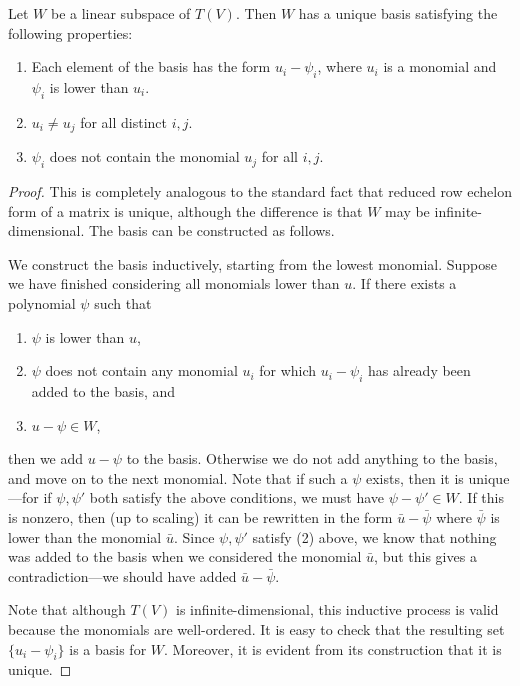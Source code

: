 \begin{prop}\label{prop:rref}
	Let $W$ be a linear subspace of $T(V)$. Then $W$ has a unique basis satisfying the following properties:
	\begin{enumerate}
		\item Each element of the basis has the form $u_i - \psi_i$, where $u_i$ is a monomial and $\psi_i$ is lower than $u_i$.
		\item $u_i \neq u_j$ for all distinct $i,j$.
		\item $\psi_i$ does not contain the monomial $u_j$ for all $i,j$.
	\end{enumerate}
\end{prop}
\begin{proof}
	This is completely analogous to the standard fact that reduced row echelon form of a matrix is unique, although the difference is that $W$ may be infinite-dimensional. The basis can be constructed as follows.
	
	We construct the basis inductively, starting from the lowest monomial. Suppose we have finished considering all monomials lower than $u$. If there exists a polynomial $\psi$ such that
	\begin{enumerate}
		\item $\psi$ is lower than $u$,
		\item $\psi$ does not contain any monomial $u_i$ for which $u_i - \psi_i$ has already been added to the basis, and
		\item $u - \psi \in W$,
	\end{enumerate}
	then we add $u - \psi$ to the basis. Otherwise we do not add anything to the basis, and move on to the next monomial. Note that if such a $\psi$ exists, then it is unique---for if $\psi,\psi'$ both satisfy the above conditions, we must have $\psi - \psi' \in W$. If this is nonzero, then (up to scaling) it can be rewritten in the form $\bar{u} - \bar{\psi}$ where $\bar{\psi}$ is lower than the monomial $\bar{u}$. Since $\psi, \psi'$ satisfy (2) above, we know that nothing was added to the basis when we considered the monomial $\bar{u}$, but this gives a contradiction---we should have added $\bar{u}-\bar{\psi}$.
	
	Note that although $T(V)$ is infinite-dimensional, this inductive process is valid because the monomials are well-ordered. It is easy to check that the resulting set $\{u_i - \psi_i\}$ is a basis for $W$. Moreover, it is evident from its construction that it is unique.
\end{proof}
